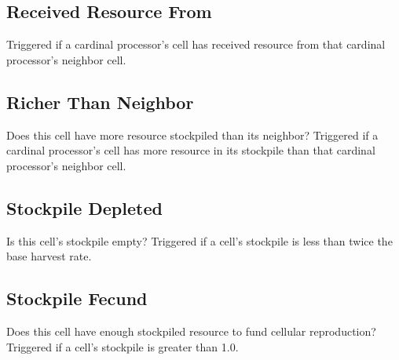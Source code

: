 \subsection{Received Resource From}

Triggered if a cardinal processor's cell has received resource from that cardinal processor's neighbor cell.

\subsection{Richer Than Neighbor}

Does this cell have more resource stockpiled than its neighbor?
Triggered if a cardinal processor's cell has more resource in its stockpile than that cardinal processor's neighbor cell.

\subsection{Stockpile Depleted}

Is this cell's stockpile empty?
Triggered if a cell's stockpile is less than twice the base harvest rate.

\subsection{Stockpile Fecund}

Does this cell have enough stockpiled resource to fund cellular reproduction?
Triggered if a cell's stockpile is greater than 1.0.
